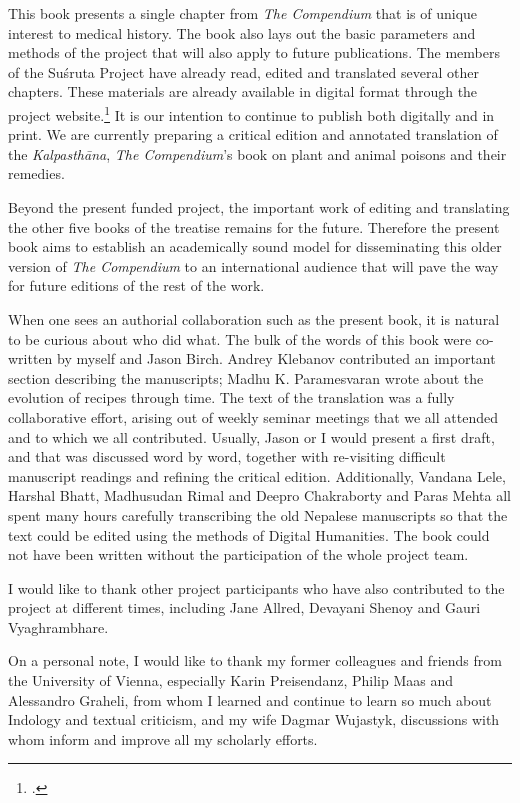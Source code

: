 This book presents a single chapter from \emph{The Compendium} that is of
unique interest to medical history.  The book also lays out the basic
parameters and methods of the project that will also apply to future
publications. The members of the Suśruta Project have already read, edited and
translated several other chapters.  These materials are already available in
digital format through the project website.\footcite{wuja-2021b} It is our
intention to continue to publish both digitally and in print.  We are
currently preparing a critical edition and annotated translation of the
\emph{Kalpasthāna}, \emph{The Compendium}'s book on plant and animal poisons
and their remedies.

Beyond the present funded project, the important work of editing and
translating the other five books of the treatise remains for the future.
Therefore the present book aims to establish an academically sound model for
disseminating this older version of \emph{The Compendium} to an international
audience that will pave the way for future editions of the rest of the work.

When one sees an authorial collaboration such as the present book, it is natural to be 
curious about who did what.  The bulk of the words of this book were co-written by 
myself and Jason Birch.  Andrey Klebanov contributed an important section describing 
the manuscripts; Madhu K. Paramesvaran wrote about the evolution of recipes 
through time. The text of the translation was a fully collaborative effort, arising out of 
weekly seminar meetings that we all attended and to which we all contributed. 
Usually, Jason or I would present a first draft, and that was discussed word by word, 
together with re-visiting difficult manuscript readings and refining the critical edition. 
Additionally, Vandana Lele, Harshal Bhatt, Madhusudan Rimal and Deepro 
Chakraborty and Paras Mehta all spent many hours carefully transcribing the old 
Nepalese manuscripts so that the text could be edited using the methods of Digital 
Humanities.  The book could not have been written without the participation of the 
whole project team.


I would like to thank other project participants who have also contributed to
the project at different times, including Jane Allred, Devayani Shenoy and
Gauri Vyaghrambhare.  

On a personal note, I would like to thank my former colleagues and friends
from the University of Vienna, especially Karin Preisendanz, Philip Maas and
Alessandro Graheli, from whom I learned and continue to learn so much about
Indology and textual criticism, and my wife Dagmar Wujastyk, discussions with
whom inform and improve all my scholarly efforts.

